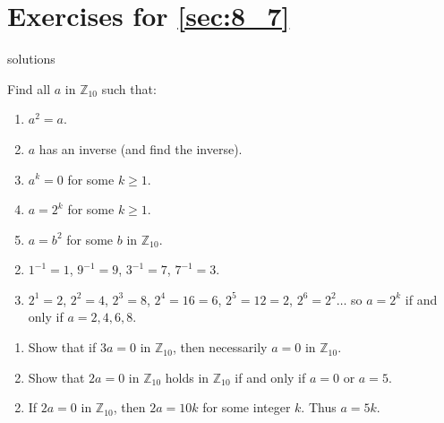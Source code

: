 
\section*{Exercises for \ref{sec:8_7}}

\begin{Filesave}{solutions}
\end{Filesave}

\begin{multicols}{2}
\begin{ex}
Find all $a$ in $\mathbb{Z}_{10}$ such that:

\begin{enumerate}[label={\alph*.}]
\item $a^{2} = a$.

\item $a$ has an inverse (and find the inverse).

\item $a^{k} = 0$ for some $k \geq 1$.

\item $a = 2^{k}$ for some $k \geq 1$.

\item $a = b^{2}$ for some $b$ in $\mathbb{Z}_{10}$.
\end{enumerate}
\begin{sol}
\begin{enumerate}[label={\alph*.}]
\setcounter{enumi}{1}
\item  $1^{-1} = 1$, $9^{-1} = 9$, $3^{-1} = 7$, $7^{-1} = 3$.

\setcounter{enumi}{3}
\item  $2^{1} = 2$, $2^{2} = 4$, $2^{3} = 8$, $2^{4} = 16 = 6$, $2^{5} = 12 = 2$, $2^{6} =
  2^{2} \dots$  so $a = 2^k$ if and only if $a = 2, 4, 6, 8$.

\end{enumerate}
\end{sol}
\end{ex}

\begin{ex}
\begin{enumerate}[label={\alph*.}]
\item Show that if $3a = 0$ in $\mathbb{Z}_{10}$, then necessarily $a = 0$ in $\mathbb{Z}_{10}$.

\item Show that $2a = 0$ in $\mathbb{Z}_{10}$  holds in $\mathbb{Z}_{10}$ if and only if $a = 0$ or $a = 5$.

\end{enumerate}
\begin{sol}
\begin{enumerate}[label={\alph*.}]
\setcounter{enumi}{1}
\item  If $2a = 0$ in $\mathbb{Z}_{10}$, then $2a = 10k$ for some integer $k$. Thus $a = 5k$.


\end{enumerate}
\end{sol}
\end{ex}
\end{multicols}
